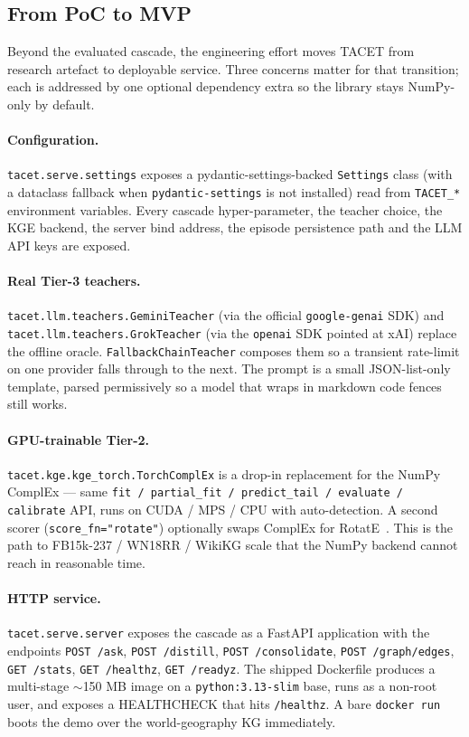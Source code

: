 \documentclass[11pt]{article}
\theoremstyle{plain}
\begin{document}
\subsection{From PoC to MVP}
\label{sec:mvp}

Beyond the evaluated cascade, the engineering effort moves TACET from
research artefact to deployable service. Three concerns matter for that transition; each is addressed by
one optional dependency extra so the library stays NumPy-only by default.

\paragraph{Configuration.}
\texttt{tacet.serve.settings} exposes a pydantic-settings-backed
\texttt{Settings} class (with a dataclass fallback when
\texttt{pydantic-settings} is not installed) read from
\texttt{TACET\_*} environment variables.
Every cascade hyper-parameter, the teacher choice, the KGE backend, the
server bind address, the episode persistence path and the LLM API keys
are exposed.

\paragraph{Real Tier-3 teachers.}
\texttt{tacet.llm.teachers.GeminiTeacher} (via the official
\texttt{google-genai} SDK) and \texttt{tacet.llm.teachers.GrokTeacher} (via
the \texttt{openai} SDK pointed at xAI) replace the offline oracle.
\texttt{FallbackChainTeacher} composes them so a transient rate-limit on
one provider falls through to the next. The
prompt is a small JSON-list-only template, parsed permissively so a model
that wraps in markdown code fences still works.

\paragraph{GPU-trainable Tier-2.}
\texttt{tacet.kge.kge\_torch.TorchComplEx} is a drop-in replacement for the
NumPy ComplEx --- same \texttt{fit / partial\_fit / predict\_tail / evaluate
/ calibrate} API, runs on CUDA / MPS / CPU with auto-detection. A second
scorer (\texttt{score\_fn="rotate"}) optionally swaps ComplEx for
RotatE~\citep{sun2019rotate}. This is the path to FB15k-237 / WN18RR /
WikiKG scale that the NumPy backend cannot reach in reasonable time.

\paragraph{HTTP service.}
\texttt{tacet.serve.server} exposes the cascade as a FastAPI application with
the endpoints \texttt{POST /ask}, \texttt{POST /distill},
\texttt{POST /consolidate}, \texttt{POST /graph/edges},
\texttt{GET /stats}, \texttt{GET /healthz}, \texttt{GET /readyz}. The
shipped Dockerfile produces a multi-stage \(\sim\)150 MB image on a
\texttt{python:3.13-slim} base, runs as a non-root user, and exposes a
HEALTHCHECK that hits \texttt{/healthz}. A bare \texttt{docker run} boots
the demo over the world-geography KG immediately.
\end{document}
